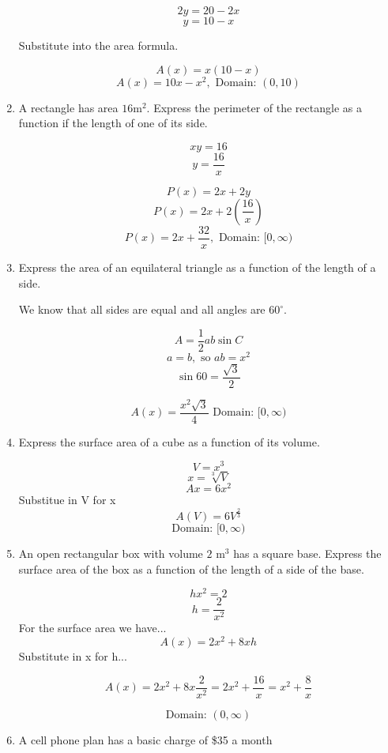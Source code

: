 \documentclass{article}
\begin{document}
\begin{enumerate}
		$$2y = 20 - 2x$$
		$$y = 10 - x$$
		
		Substitute into the area formula.
		
		$$A(x) = x(10 - x)$$
		$$A(x) = 10x - x^2, \text{ Domain: } (0, 10)$$
		
	\item A rectangle has area $16 \text{m}^2$. Express the perimeter of the rectangle as a
		function if the length of one of its side.
		
		$$xy = 16$$
		$$y = \frac{16}{x}$$
		
		$$P(x) = 2x + 2y$$
		$$P(x) = 2x + 2(\frac{16}{x})$$
		$$P(x) = 2x + \frac{32}{x}, \text{ Domain: } [0, \infty)$$
		
	\item Express the area of an equilateral triangle as a function of the length of a side.
	
		We know that all sides are equal and all angles are $60^{\circ}$.

		$$A = \frac{1}{2}ab\sin C$$
		$$ a = b, \text{ so } ab = x^2 $$
		$$\sin 60 = \frac{\sqrt{3}}{2}$$

		$$ A(x) = \frac{x^2\sqrt{3}}{4} \text{ Domain: } [0, \infty)$$

	\item Express the surface area of a cube as a function of its volume.

		$$V = x^3$$
		$$x = \sqrt[3]{V}$$
		$$A{x} = 6 x^2$$
		Substitue in V for x
		$$A(V) = 6 V^{\frac{2}{3}}$$
		$$\text{Domain: } [0, \infty)$$

	\item An open rectangular box with volume $2 \text{ m}^3$ has a square base.
		Express the surface area of the box as a function of the length of a side of the base.

		$$hx^2 = 2$$
		$$h = \frac{2}{x^2}$$
		For the surface area we have...
		$$A(x) = 2x^2 + 8xh$$
		Substitute in x for h...
	
		$$A(x) = 2x^2 + 8x\frac{2}{x^2} = 2x^2 + \frac{16}{x} = x^2 + \frac{8}{x}$$

	 	$$\text{Domain: } (0, \infty)$$

	\item A cell phone plan has a basic charge of \$35 a month
	\end{enumerate}
	
\end{document}
